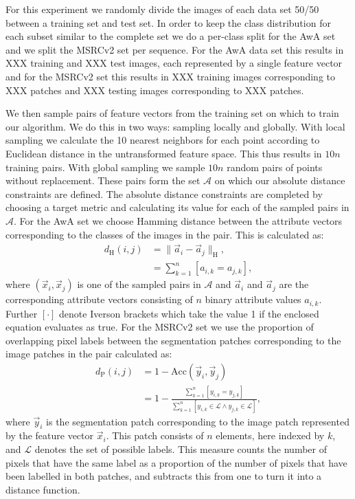 For this experiment we randomly divide the images of each data set 50/50 between a training set and test set. In order to keep the class distribution for each subset similar to the complete set we do a per-class split for the \ac{AwA} set and we split the \ac{MSRCv2} set per sequence. For the \ac{AwA} data set this results in XXX training and XXX test images, each represented by a single feature vector and for the \ac{MSRCv2} set this results in XXX training images corresponding to XXX patches and XXX testing images corresponding to XXX patches.

We then sample pairs of feature vectors from the training set on which to train our algorithm. We do this in two ways: sampling locally and globally. With local sampling we calculate the 10 nearest neighbors for each point according to Euclidean distance in the untransformed feature space. This thus results in $10 n$ training pairs. With global sampling we sample $10 n$ random pairs of points without replacement. These pairs form the set $\mathcal{A}$ on which our absolute distance constraints are defined. The absolute distance constraints are completed by choosing a target metric and calculating its value for each of the sampled pairs in $\mathcal{A}$. For the \ac{AwA} set we choose Hamming distance between the attribute vectors corresponding to the classes of the images in the pair. This is calculated as:
\begin{align}
d_{\text{H}}(i, j) &= \|\vec{a}_i - \vec{a}_j\|_{\text{H}}, \\
 &= \sum_{k=1}^{n} \left[ a_{i,k} = a_{j,k} \right],
\end{align}
where $(\vec{x}_i, \vec{x}_j)$ is one of the sampled pairs in $\mathcal{A}$ and $\vec{a}_i$ and $\vec{a}_j$ are the corresponding attribute vectors consisting of $n$ binary attribute values $a_{i,k}$. Further $[ \cdot ]$ denote Iverson brackets which take the value 1 if the enclosed equation evaluates as true. For the \ac{MSRCv2} set we use the proportion of overlapping pixel labels between the segmentation patches corresponding to the image patches in the pair calculated as:
\begin{align}
d_{\text{P}}(i, j) &= 1 - \text{Acc}(\vec{y}_i, \vec{y}_j) \\
&= 1 - \frac{ \sum_{k=1}^{n} \left[ y_{i,k} = y_{j,k} \right] }{ \sum_{k=1}^{n} \left[ y_{i,k} \in \mathcal{L} \wedge y_{j,k} \in \mathcal{L} \right]},
\end{align}
where $\vec{y}_i$ is the segmentation patch corresponding to the image patch represented by the feature vector $\vec{x}_i$. This patch consists of $n$ elements, here indexed by $k$, and $\mathcal{L}$ denotes the set of possible labels. This measure counts the number of pixels that have the same label as a proportion of the number of pixels that have been labelled in both patches, and subtracts this from one to turn it into a distance function.

